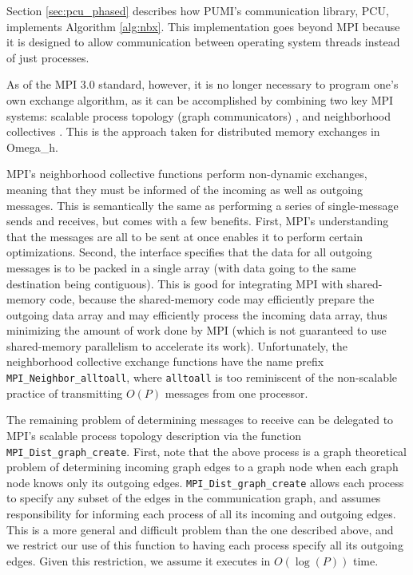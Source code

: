 Section \ref{sec:pcu_phased} describes how PUMI's communication
library, PCU, implements Algorithm \ref{alg:nbx}.
This implementation goes beyond MPI because it is designed to
allow communication between operating system threads instead
of just processes.

As of the MPI 3.0 standard, however, it is no longer necessary to
program one's own exchange algorithm, as it can be accomplished
by combining two key MPI systems:
scalable process topology (graph communicators) \cite{hoefler2011scalable},
and neighborhood collectives \cite{hoefler2012optimization}.
This is the approach taken for distributed memory exchanges
in Omega\_h.

MPI's neighborhood collective functions perform non-dynamic
exchanges, meaning that they must be informed of the incoming
as well as outgoing messages.
This is semantically the same as performing a series of single-message
sends and receives, but comes with a few benefits.
First, MPI's understanding that the messages are all to be
sent at once enables it to perform certain optimizations.
Second, the interface specifies that the data for all
outgoing messages is to be packed in a single array
(with data going to the same destination being contiguous).
This is good for integrating MPI with shared-memory
code, because the shared-memory code may efficiently prepare
the outgoing data array and may efficiently process the incoming
data array, thus minimizing the amount of work done by MPI
(which is not guaranteed to use shared-memory parallelism to
accelerate its work).
Unfortunately, the neighborhood collective exchange functions
have the name prefix \texttt{MPI\_Neighbor\_alltoall}, where
\texttt{alltoall} is too reminiscent of the non-scalable practice
of transmitting $O(P)$ messages from one processor.

The remaining problem of determining messages to receive can
be delegated to MPI's scalable process topology description
via the function \texttt{MPI\_Dist\_graph\_create}.
First, note that the above process is a graph theoretical problem
of determining incoming graph edges to a graph node when each
graph node knows only its outgoing edges.
\texttt{MPI\_Dist\_graph\_create} allows each process to specify
any subset of the edges in the communication graph, and assumes
responsibility for informing each process of all its incoming
and outgoing edges.
This is a more general and difficult problem than the one described
above, and we restrict our use of this function to having each
process specify all its outgoing edges.
Given this restriction, we assume it executes in $O(\log(P))$ time.

